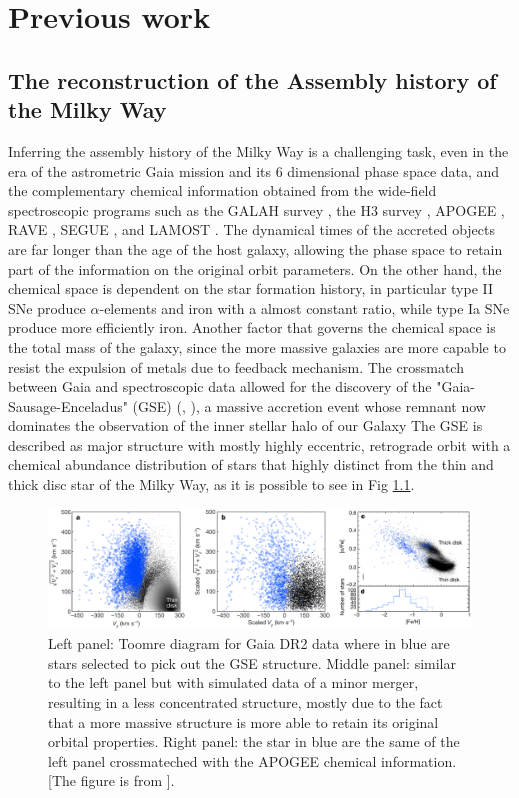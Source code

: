 \chapter{Previous work}

\section{The reconstruction of the Assembly history of the Milky Way}
Inferring the assembly history of the Milky Way is a challenging task, even in the era of the astrometric Gaia mission and its 6 dimensional 
phase space data, and the complementary chemical information obtained from the wide-field spectroscopic programs such as the GALAH survey
\cite{desilvaGALAHSurveyScientific2015}, the H3 survey \cite{conroyMappingStellarHalo2019}, APOGEE \cite{majewskiApachePointObservatory2017}, RAVE \cite{steinmetzRadialVelocityExperiment2006},  SEGUE \cite{yannySEGUESPECTROSCOPICSURVEY2009}, and 
LAMOST \cite{cuiLargeSkyArea2012}. The dynamical times of the accreted objects are far longer than the age of the host galaxy, allowing the 
phase space to retain part of the information on the original orbit parameters. On the other hand, the chemical space is dependent on the star formation history, in particular type II SNe produce $\alpha$-elements and iron with a almost constant ratio, while type Ia SNe produce more efficiently iron. Another factor that governs the chemical space is the total mass of the galaxy, since the more massive galaxies are more capable to resist the expulsion of metals due to feedback mechanism. The crossmatch between Gaia and spectroscopic data allowed for the discovery of the "Gaia-Sausage-Enceladus" (GSE) (\cite{belokurovCoformationDiscStellar2018}, \cite{helmiMergerThatLed2018}), a massive accretion event whose remnant now dominates the observation of the inner stellar halo of our Galaxy The GSE is described as major structure with mostly highly eccentric, retrograde orbit with a chemical abundance distribution of stars that highly distinct from the thin and thick disc star of the Milky Way, as it is possible to see in Fig \ref{fig:Gaia_Helmi}.  
\begin{figure}[h]
    \centering
    \includegraphics[width=1\textwidth]{./figure/Gaia_Helmi18.png}
    \caption{Left panel: Toomre diagram for Gaia DR2 data where in blue are stars selected to pick out the GSE structure. Middle panel:  similar to the left panel but with simulated data of a minor merger, resulting in a less concentrated structure, mostly due to the fact that a more massive structure is more able to retain its original orbital properties. Right panel: the star in blue are the same of the left panel crossmateched with the APOGEE chemical information.  [The figure is from \cite{helmiMergerThatLed2018}].}
    \label{fig:Gaia_Helmi}
\end{figure}
